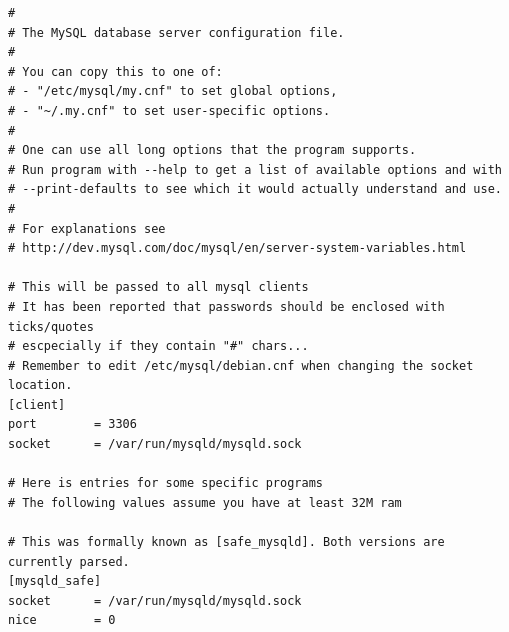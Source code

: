 \documentclass{ta-its}
\begin{document}
		    \begin{lstlisting}[frame=single,tabsize=2,breaklines,caption={Konfigurasi MySQL untuk Server Basis Data},label=implemenDB]
#
# The MySQL database server configuration file.
#
# You can copy this to one of:
# - "/etc/mysql/my.cnf" to set global options,
# - "~/.my.cnf" to set user-specific options.
# 
# One can use all long options that the program supports.
# Run program with --help to get a list of available options and with
# --print-defaults to see which it would actually understand and use.
#
# For explanations see
# http://dev.mysql.com/doc/mysql/en/server-system-variables.html

# This will be passed to all mysql clients
# It has been reported that passwords should be enclosed with ticks/quotes
# escpecially if they contain "#" chars...
# Remember to edit /etc/mysql/debian.cnf when changing the socket location.
[client]
port		= 3306
socket		= /var/run/mysqld/mysqld.sock

# Here is entries for some specific programs
# The following values assume you have at least 32M ram

# This was formally known as [safe_mysqld]. Both versions are currently parsed.
[mysqld_safe]
socket		= /var/run/mysqld/mysqld.sock
nice		= 0


\end{lstlisting}
\end{document}
